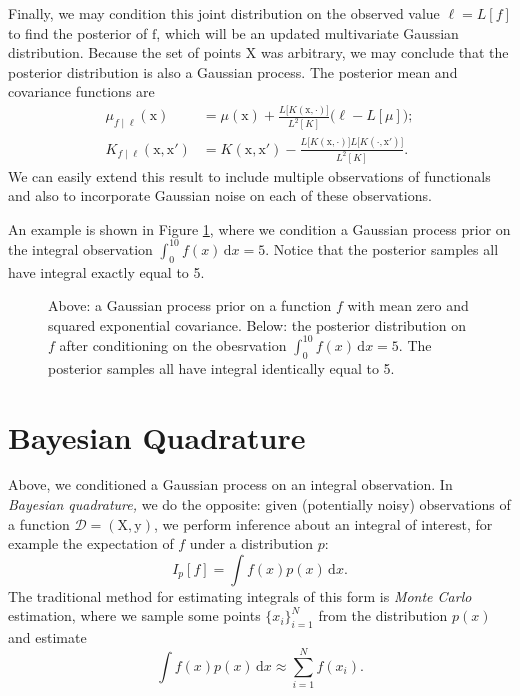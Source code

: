 \documentclass{article}
\newcommand{\given}{\mid}
\newcommand{\mc}[1]{\mathcal{#1}}
\newcommand{\data}{\mc{D}}
\newcommand{\intd}[1]{\,\mathrm{d}{#1}}
\newcommand{\mat}[1]{\bm{\mathrm{#1}}}
\renewcommand{\vec}[1]{\bm{\mathrm{#1}}}
\begin{document}
Finally, we may condition this joint distribution on the observed
value $\ell = L[f]$ to find the posterior of $\vec{f}$, which will be
an updated multivariate Gaussian distribution.  Because the set of
points $\mat{X}$ was arbitrary, we may conclude that the posterior
distribution is also a Gaussian process.  The posterior mean and
covariance functions are
\begin{align*}
  \mu_{f \given \ell}(\vec{x})
  &=
  \mu(\vec{x})
  +
  \frac{L\bigl[K(\vec{x}, \cdot)\bigr]}{L^2[K]}
  \bigl(\ell - L[\mu]);
  \\
  K_{f \given \ell}(\vec{x}, \vec{x}')
  &=
  K(\vec{x}, \vec{x}')
  -
  \frac{L\bigl[K(\vec{x}, \cdot)\bigr]L\bigl[K(\cdot, \vec{x}')\bigr]}{L^2[K]}.
\end{align*}
We can easily extend this result to include multiple observations of
functionals and also to incorporate Gaussian noise on each of these
observations.

An example is shown in Figure \ref{example}, where we condition a
Gaussian process prior on the integral observation $\int_{0}^{10} f(x)
\intd{x} = 5$.  Notice that the posterior samples all have integral
exactly equal to 5.

\begin{figure}
  \centering
  
  
  \caption{Above: a Gaussian process prior on a function $f$ with mean
    zero and squared exponential covariance.  Below: the posterior
    distribution on $f$ after conditioning on the obesrvation
    $\int_{0}^{10} f(x) \intd{x} = 5$.  The posterior samples all have
    integral identically equal to 5.}
  \label{example}
\end{figure}

\section*{Bayesian Quadrature}

Above, we conditioned a Gaussian process on an integral observation.
In \emph{Bayesian quadrature,} we do the opposite: given (potentially
noisy) observations of a function $\data = (\mat{X}, \vec{y})$, we
perform inference about an integral of interest, for example the
expectation of $f$ under a distribution $p$:
\begin{equation*}
  I_p[f] = \int f(x) p(x) \intd{x}.
\end{equation*}
The traditional method for estimating integrals of this form is
\emph{Monte Carlo} estimation, where we sample some points $\{ x_i
\}_{i = 1}^N$ from the distribution $p(x)$ and estimate
\begin{equation*}
  \int f(x) p(x) \intd{x}
  \approx
  \sum_{i = 1}^N f(x_i).
\end{equation*}
\end{document}
